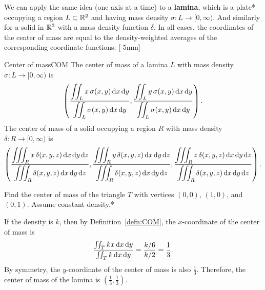 \documentclass[prettycode,shellescape]{watsonbook}
\begin{document}
We can apply the same idea (one axis at a time) to a \textbf{lamina},
which is a plate* occupying a region $L\subset \mathbb{R}^2$ and having mass
density $\sigma:L \to [0,\infty)$. And similarly for a solid in $\mathbb{R}^3$
with a mass density function $\delta$. In all cases, the coordinates
of the center of mass are equal to the density-weighted averages of
the corresponding coordinate functions: [-5mm]

\begin{defn}{Center of mass}{COM}
  The {center of mass} of a lamina $L$ with mass density $\sigma:L \to [0,\infty)$ is
  \[
    \left(
      \frac{\displaystyle{\iint_L x \, \sigma(x,y) \, \mathrm{d}x \, \mathrm{d}y}}
      {\displaystyle{\iint_L \sigma(x,y) \, \mathrm{d}x \, \mathrm{d}y}},
      \frac{\displaystyle{\iint_L y \, \sigma(x,y) \, \mathrm{d}x \, \mathrm{d}y}}
      {\displaystyle{\iint_L \sigma(x,y) \, \mathrm{d}x \, \mathrm{d}y}}
    \right). 
  \]
  The center of mass of a solid occupying a region $R$ with mass
  density $\delta:R \to [0,\infty)$ is
  \[
    \left(
      \frac{\displaystyle{\iiint_R x \, \delta(x,y,z) \, \mathrm{d}x \, \mathrm{d}y \, \mathrm{d}z}}
      {\displaystyle{\iiint_R \delta(x,y,z) \, \mathrm{d}x \, \mathrm{d}y \, \mathrm{d}z}},
      \frac{\displaystyle{\iiint_R y \, \delta(x,y,z) \, \mathrm{d}x \, \mathrm{d}y \, \mathrm{d}z}}
      {\displaystyle{\iiint_R \delta(x,y,z) \, \mathrm{d}x \, \mathrm{d}y \, \mathrm{d}z}},
      \frac{\displaystyle{\iiint_R z \, \delta(x,y,z) \, \mathrm{d}x \, \mathrm{d}y \, \mathrm{d}z}}
      {\displaystyle{\iiint_R \delta(x,y,z) \, \mathrm{d}x \, \mathrm{d}y \, \mathrm{d}z}}
    \right). 
  \]
\end{defn}

\begin{example}{}{}
  Find the center of mass of the triangle $T$ with vertices $(0,0)$,
  $(1,0)$, and $(0,1)$. Assume constant density.* 
\end{example}

\begin{solution}
  If the density is $k$, then by Definition~\ref{defn:COM}, the
  $x$-coordinate of the center of mass is
  \[
    \frac{\iint_T kx \, \mathrm{d} x \, \mathrm{d} y}{\iint_T k \, \mathrm{d} x \, \mathrm{d} y}
    =\frac{k/6}{k/2} = \frac{1}{3}.
  \]
  By symmetry, the $y$-coordinate of the center of mass is also
  $\tfrac{1}{3}$. Therefore, the center of mass of the lamina is
  $\boxed{\left(\tfrac{1}{3}, \tfrac{1}{3}\right)}$.
\end{solution}
\end{document}
